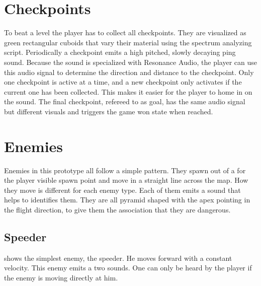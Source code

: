 \section{Checkpoints}
To beat a level the player has to collect all checkpoints. They are visualized as green rectangular cuboids that vary their material using the spectrum analyzing script. Periodically a checkpoint emits a high pitched, slowly decaying ping sound. Because the sound is specialized with Resonance Audio, the player can use this audio signal to determine the direction and distance to the checkpoint. Only one checkpoint is active at a time, and a new checkpoint only activates if the current one has been collected. This makes it easier for the player to home in on the sound. The final checkpoint, refereed to as goal, has the same audio signal but different visuals and triggers the game won state when reached.


\section{Enemies}
Enemies in this prototype all follow a simple pattern. They spawn out of a for the player visible spawn point and move in a straight line across the map. How they move is different for each enemy type. Each of them emits a sound that helps to identifies them. They are all pyramid shaped with the apex pointing in the flight direction, to give them the association that they are dangerous.


\subsection{Speeder}
 shows the simplest enemy, the speeder. He moves forward with a constant velocity. This enemy emits a two sounds. One can only be heard by the player if the enemy is moving directly at him.

